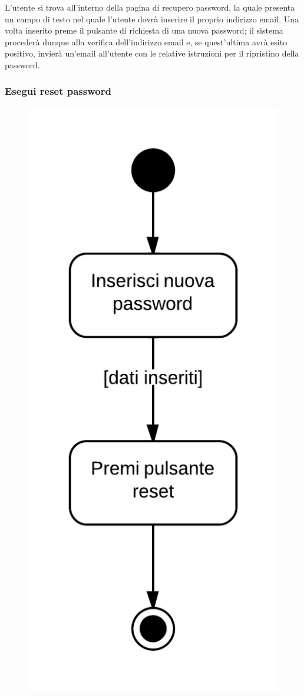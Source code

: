 L'utente si trova all'interno della pagina di recupero password, la quale presenta un campo di testo nel quale l'utente dovrà inserire il proprio indirizzo email. Una volta inserito preme il pulsante di richiesta di una nuova password; il sistema  procederà dunque alla verifica dell'indirizzo email e, se quest'ultima avrà esito positivo, invierà un'email all'utente con le relative istruzioni per il ripristino della password.

\subsubsection{Esegui reset password}

\begin{figure}[H]
\centering
\includegraphics[scale=0.2]{uml/MaaP - Esegui reset password.png}

\end{figure}
